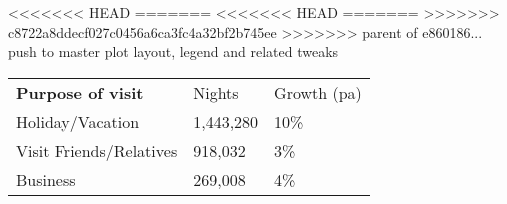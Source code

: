 <<<<<<< HEAD
=======
<<<<<<< HEAD
=======
>>>>>>> c8722a8ddecf027c0456a6ca3fc4a32bf2b745ee
>>>>>>> parent of e860186... push to master plot layout, legend and related tweaks
\begin{tabular}[t]{p{4.8cm}>{\hfill}p{1.3cm}>{\hfill}p{1.4cm}}
 \textbf{Purpose of visit} & Nights & Growth (pa) \\ 
 Holiday/Vacation & 1,443,280 & 10\% \\ 
  Visit Friends/Relatives &   918,032 & 3\% \\ 
  Business &   269,008 & 4\% \\ 
  \end{tabular}
